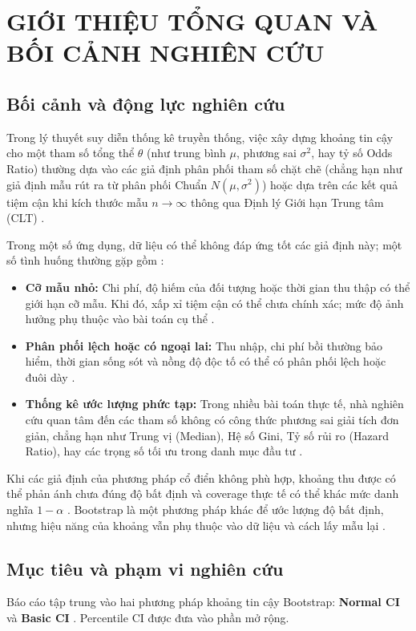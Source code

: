 	\section{GIỚI THIỆU TỔNG QUAN VÀ BỐI CẢNH NGHIÊN CỨU}
	
	\subsection{Bối cảnh và động lực nghiên cứu}
	Trong lý thuyết suy diễn thống kê truyền thống, việc xây dựng khoảng tin cậy cho một tham số tổng thể $\theta$ (như trung bình $\mu$, phương sai $\sigma^2$, hay tỷ số Odds Ratio) thường dựa vào các giả định phân phối tham số chặt chẽ (chẳng hạn như giả định mẫu rút ra từ phân phối Chuẩn $N(\mu, \sigma^2)$) hoặc dựa trên các kết quả tiệm cận khi kích thước mẫu $n \to \infty$ thông qua Định lý Giới hạn Trung tâm (CLT) \cite{buithuytrang2026}. 
	
	Trong một số ứng dụng, dữ liệu có thể không đáp ứng tốt các giả định này; một số tình huống thường gặp gồm \cite{efron1993}:
	\begin{itemize}
		\item \textbf{Cỡ mẫu nhỏ:} Chi phí, độ hiếm của đối tượng hoặc thời gian thu thập có thể giới hạn cỡ mẫu. Khi đó, xấp xỉ tiệm cận có thể chưa chính xác; mức độ ảnh hưởng phụ thuộc vào bài toán cụ thể \cite{efron1993}.
		\item \textbf{Phân phối lệch hoặc có ngoại lai:} Thu nhập, chi phí bồi thường bảo hiểm, thời gian sống sót và nồng độ độc tố có thể có phân phối lệch hoặc đuôi dày \cite{davison1997}.
		\item \textbf{Thống kê ước lượng phức tạp:} Trong nhiều bài toán thực tế, nhà nghiên cứu quan tâm đến các tham số không có công thức phương sai giải tích đơn giản, chẳng hạn như Trung vị (Median), Hệ số Gini, Tỷ số rủi ro (Hazard Ratio), hay các trọng số tối ưu trong danh mục đầu tư \cite{efron1993}.
	\end{itemize}
	
	Khi các giả định của phương pháp cổ điển không phù hợp, khoảng thu được có thể phản ánh chưa đúng độ bất định và coverage thực tế có thể khác mức danh nghĩa $1-\alpha$ \cite{davison1997}. Bootstrap là một phương pháp khác để ước lượng độ bất định, nhưng hiệu năng của khoảng vẫn phụ thuộc vào dữ liệu và cách lấy mẫu lại \cite{efron1979}.

	\subsection{Mục tiêu và phạm vi nghiên cứu}
	Báo cáo tập trung vào hai phương pháp khoảng tin cậy Bootstrap: \textbf{Normal CI} và \textbf{Basic CI} \cite{buithuytrang2026}. Percentile CI được đưa vào phần mở rộng.
	
